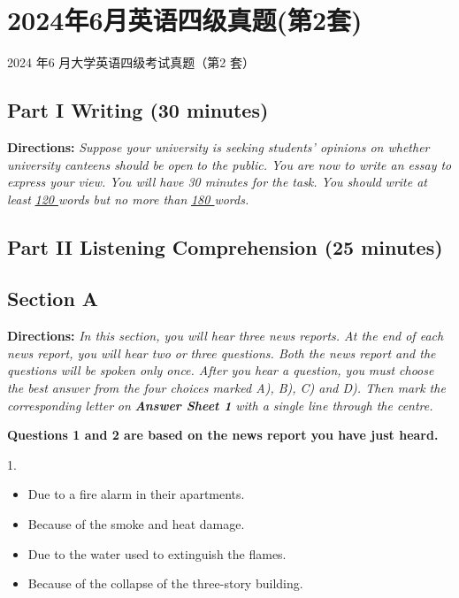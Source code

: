 \documentclass[UTF8,11pt]{ctexart}
\begin{document}
\section*{2024年6月英语四级真题(第2套)}
2024 年6 月大学英语四级考试真题（第2 套）


\subsection*{\textbf{Part I Writing} \textbf{(30 minutes)}}


\textbf{Directions:} \textit{Suppose your university is seeking students’ opinions on whether university canteens should be open} \textit{to the public. You are now to write an essay to express your view. You will have 30 minutes for the task. You should} \textit{write at least }\textit{\uline{120 }}\textit{words but no more than }\textit{\uline{180 }}\textit{words.}


\subsection*{\textbf{Part II} \textbf{Listening Comprehension} \textbf{(25 minutes)}}


\subsection*{\textbf{Section A}}


\textbf{Directions:} \textit{In this section, you will hear three news reports. At the end of each news report, you will hear two or} \textit{three questions. Both the news report and the questions will be spoken only once. After you hear a question, you} \textit{must choose the best answer from the four choices marked A), B), C) and D). Then mark the corresponding letter} \textit{on }\textbf{\textit{Answer Sheet 1}}\textit{ with a single line through the centre.}


\textbf{Questions 1 and 2 are based on the news report you have just heard.}


1.


\begin{itemize}[leftmargin=2em,itemsep=.2em,topsep=.4em]\item[A.] Due to a fire alarm in their apartments.
\item[B.] Because of the smoke and heat damage.
\item[C.] Due to the water used to extinguish the flames.
\item[D.] Because of the collapse of the three-story building.
\end{itemize}
\end{document}
